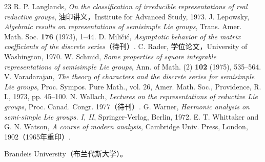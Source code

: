 \begin{thebibliography}{23}
 R. P. Langlands, \textit{On the classification of irreducible representations of real reductive groups}, 油印讲义，Institute for Advanced Study, 1973.
 J. Lepowsky, \textit{Algebraic results on representations of semisimple Lie groups}, Trans. Amer. Math. Soc. \textbf{176} (1973), 1--44.
 D. Miličić, \textit{Asymptotic behavior of the matrix coefficients of the discrete series}（待刊）.
 C. Rader, 学位论文，University of Washington, 1970.
 W. Schmid, \textit{Some properties of square integrable representations of semisimple Lie groups}, Ann. of Math. (2) \textbf{102} (1975), 535--564.
 V. Varadarajan, \textit{The theory of characters and the discrete series for semisimple Lie groups}, Proc. Sympos. Pure Math., vol. 26, Amer. Math. Soc., Providence, R. I., 1973, pp. 45--100.
 N. Wallach, \textit{Lectures on the representations of reductive Lie groups}, Proc. Canad. Congr. 1977（待刊）.
 G. Warner, \textit{Harmonic analysis on semi-simple Lie groups. I, II}, Springer-Verlag, Berlin, 1972.
 E. T. Whittaker and G. N. Watson, \textit{A course of modern analysis}, Cambridge Univ. Press, London, 1902（1965年重印）.
\end{thebibliography}
\noindent Brandeis University（布兰代斯大学）。
